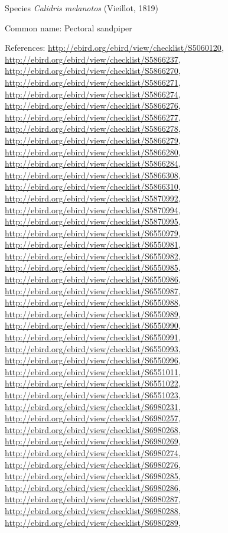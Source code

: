 \documentclass[9pt, article]{memoir}
\begin{document}
\begin{multicols}{2}
\vspace{6pt}\noindent\hspace{36pt}Species \textit{Calidris melanotos} (Vieillot, 1819)


Common name: Pectoral sandpiper

References: 
\url{http://ebird.org/ebird/view/checklist/S5060120}, 
\url{http://ebird.org/ebird/view/checklist/S5866237}, 
\url{http://ebird.org/ebird/view/checklist/S5866270}, 
\url{http://ebird.org/ebird/view/checklist/S5866271}, 
\url{http://ebird.org/ebird/view/checklist/S5866274}, 
\url{http://ebird.org/ebird/view/checklist/S5866276}, 
\url{http://ebird.org/ebird/view/checklist/S5866277}, 
\url{http://ebird.org/ebird/view/checklist/S5866278}, 
\url{http://ebird.org/ebird/view/checklist/S5866279}, 
\url{http://ebird.org/ebird/view/checklist/S5866280}, 
\url{http://ebird.org/ebird/view/checklist/S5866284}, 
\url{http://ebird.org/ebird/view/checklist/S5866308}, 
\url{http://ebird.org/ebird/view/checklist/S5866310}, 
\url{http://ebird.org/ebird/view/checklist/S5870992}, 
\url{http://ebird.org/ebird/view/checklist/S5870994}, 
\url{http://ebird.org/ebird/view/checklist/S5870995}, 
\url{http://ebird.org/ebird/view/checklist/S6550979}, 
\url{http://ebird.org/ebird/view/checklist/S6550981}, 
\url{http://ebird.org/ebird/view/checklist/S6550982}, 
\url{http://ebird.org/ebird/view/checklist/S6550985}, 
\url{http://ebird.org/ebird/view/checklist/S6550986}, 
\url{http://ebird.org/ebird/view/checklist/S6550987}, 
\url{http://ebird.org/ebird/view/checklist/S6550988}, 
\url{http://ebird.org/ebird/view/checklist/S6550989}, 
\url{http://ebird.org/ebird/view/checklist/S6550990}, 
\url{http://ebird.org/ebird/view/checklist/S6550991}, 
\url{http://ebird.org/ebird/view/checklist/S6550993}, 
\url{http://ebird.org/ebird/view/checklist/S6550996}, 
\url{http://ebird.org/ebird/view/checklist/S6551011}, 
\url{http://ebird.org/ebird/view/checklist/S6551022}, 
\url{http://ebird.org/ebird/view/checklist/S6551023}, 
\url{http://ebird.org/ebird/view/checklist/S6980231}, 
\url{http://ebird.org/ebird/view/checklist/S6980257}, 
\url{http://ebird.org/ebird/view/checklist/S6980268}, 
\url{http://ebird.org/ebird/view/checklist/S6980269}, 
\url{http://ebird.org/ebird/view/checklist/S6980274}, 
\url{http://ebird.org/ebird/view/checklist/S6980276}, 
\url{http://ebird.org/ebird/view/checklist/S6980285}, 
\url{http://ebird.org/ebird/view/checklist/S6980286}, 
\url{http://ebird.org/ebird/view/checklist/S6980287}, 
\url{http://ebird.org/ebird/view/checklist/S6980288}, 
\url{http://ebird.org/ebird/view/checklist/S6980289}, 

\end{multicols}
\end{document}
